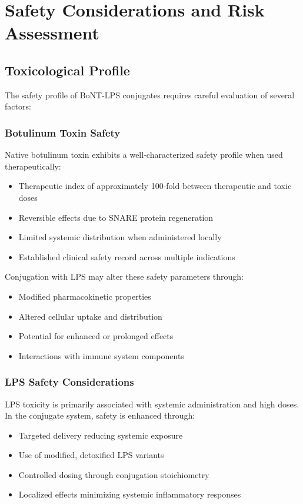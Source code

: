\documentclass[11pt,a4paper]{article}
\begin{document}
\section{Safety Considerations and Risk Assessment}

\subsection{Toxicological Profile}

The safety profile of BoNT-LPS conjugates requires careful evaluation of several factors:

\subsubsection{Botulinum Toxin Safety}

Native botulinum toxin exhibits a well-characterized safety profile when used therapeutically:
\begin{itemize}
\item Therapeutic index of approximately 100-fold between therapeutic and toxic doses
\item Reversible effects due to SNARE protein regeneration
\item Limited systemic distribution when administered locally
\item Established clinical safety record across multiple indications
\end{itemize}

Conjugation with LPS may alter these safety parameters through:
\begin{itemize}
\item Modified pharmacokinetic properties
\item Altered cellular uptake and distribution
\item Potential for enhanced or prolonged effects
\item Interactions with immune system components
\end{itemize}

\subsubsection{LPS Safety Considerations}

LPS toxicity is primarily associated with systemic administration and high doses. In the conjugate system, safety is enhanced through:
\begin{itemize}
\item Targeted delivery reducing systemic exposure
\item Use of modified, detoxified LPS variants
\item Controlled dosing through conjugation stoichiometry
\item Localized effects minimizing systemic inflammatory responses
\end{itemize}
\end{document}
